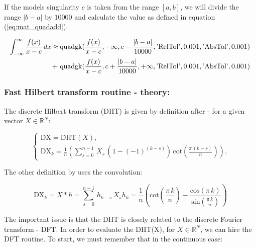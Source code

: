 \documentclass[12pt,twoside,a4paper]{article}
\numberwithin{equation}{subsection}
\numberwithin{figure}{subsection}
\def\Xint#1{\mathchoice
{\XXint\displaystyle\textstyle{#1}}%
{\XXint\textstyle\scriptstyle{#1}}%
{\XXint\scriptstyle\scriptscriptstyle{#1}}%
{\XXint\scriptscriptstyle\scriptscriptstyle{#1}}%
\!\int}
\def\XXint#1#2#3{{\setbox0=\hbox{$#1{#2#3}{\int}$ }\vcenter{\hbox{$#2#3$ }}\kern-.6\wd0}}
\def\dashint{\Xint-}
\begin{document}
If the models singularity $c$ is taken from the range $[a, b]$, we will divide the range $|b-a|$ by $10000$ and calculate the value as defined in equation (\ref{eq:mat_quadadd}). 
 
\begin{alignat}{1} \label{eq:mat_quadadd}
  \dashint_{ - \infty }^{\infty } \frac {f(x)}{x-c} \, dx \approx 
          & \, \mathrm{quadgk}(\frac {f(x)}{x-c}, - \infty, c - \frac{|b-a|}{10000}, \text{'RelTol'}, 0.001, \text{'AbsTol'}, 0.001 ) \\
     + \, & \, \mathrm{quadgk}(\frac {f(x)}{x-c}, c + \frac{|b-a|}{10000}, + \infty, \text{'RelTol'}, 0.001, \text{'AbsTol'}, 0.001 )
     \nonumber
\end{alignat}
 
\subsubsection*{Fast Hilbert transform routine - theory:}

The discrete Hilbert transform (DHT) is given by definition after \cite{kak_multilayeredarray} - for a given vector $X \in \mathbb{R} ^ N$:

\begin{equation} \label{eq:matlab_fhttheroy}
	\begin{cases}
		\mathrm{DX} = \mathrm{DHT}(X), \\
		\mathrm{DX}_k = \frac {1}{n} 
			\left( 
				\sum_{s = 0}^{n - 1} \, X_s \, (1 - ( - 1)^{(k - s)})\,\mathrm{cot}(\frac {\pi \,(k - s) }{n}) 
			\right).
	\end{cases}
\end{equation}

The other definition by \cite{calvetti_computation} uses the convolution:

\begin{subequations} \label{eq:matlab_convolution}
	\begin{equation}   \label{eq:mconv_dht}
		\mathrm{DX}_k = X * h = \sum_{s=0}^{n - 1}\,{h_{k - s}}\,{X_{s}}
	\end{equation}
	\begin{equation}   \label{eq:mconv_hk}
    	h_k = \frac{1}{n} 
    	\left(  
    		\mathrm{cot}(\frac {\pi \, k}{n}) - \frac{\mathrm{cos}(\pi \, k)}{\mathrm{sin}(\frac {\pi \, k}{n})}
		\right) 
	\end{equation}
\end{subequations}

The important issue is that the DHT is closely related to the discrete Fourier transform - DFT. In order to evaluate the DHT(X), for $X \in \mathbb{R} ^ N$, we can hire the DFT routine. To start, we must remember that in the continuous case:
\end{document}
